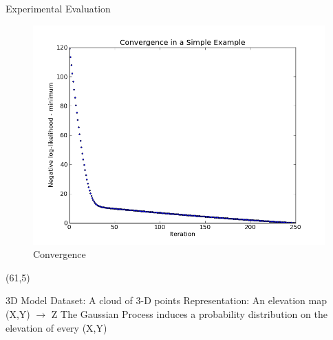 \documentclass[final]{beamer}
\begin{document}
\begin{frame}{}
\begin{textblock}{27.5}
\begin{block}{Experimental Evaluation}
\begin{figure}
\includegraphics[width=8in]{likelihood.png}
\caption{Convergence}
\end{figure}

\end{block}

\end{textblock}

\begin{textblock}{27}(61,5)

\begin{block}{3D Model}
Dataset: A cloud of 3-D points
Representation: An elevation map (X,Y) $\rightarrow$ Z
The Gaussian Process induces a probability distribution on the elevation of every (X,Y)


\end{block}
\end{textblock}
\end{frame}
\end{document}
